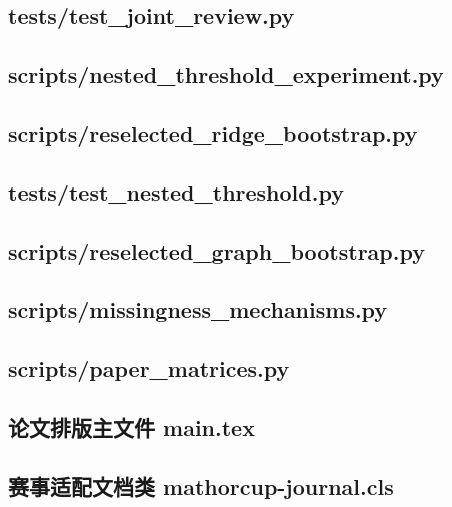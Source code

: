 \documentclass{mathorcup-journal}
\begin{document}
\subsection*{tests/test\_joint\_review.py}

\subsection*{scripts/nested\_threshold\_experiment.py}

\subsection*{scripts/reselected\_ridge\_bootstrap.py}

\subsection*{tests/test\_nested\_threshold.py}

\subsection*{scripts/reselected\_graph\_bootstrap.py}

\subsection*{scripts/missingness\_mechanisms.py}

\subsection*{scripts/paper\_matrices.py}

\subsection*{论文排版主文件 main.tex}

\subsection*{赛事适配文档类 mathorcup-journal.cls}

\end{document}
